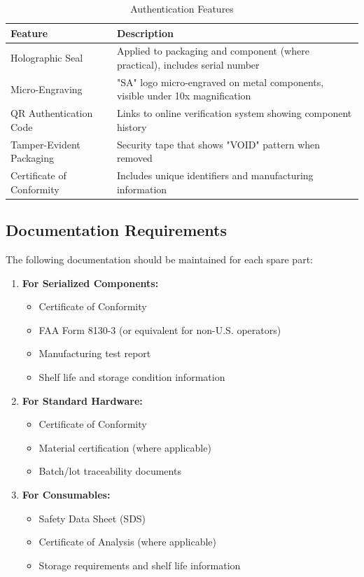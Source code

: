 \documentclass[12pt,a4paper,twoside,openright]{book}
\newcommand{\tabletextfont}{\normalfont\rmfamily}
\newcommand{\tableheadfont}{\normalfont\bfseries}
\begin{document}
\begin{table}[h]
\centering
\setlength{\tabcolsep}{5pt} %
\begin{tabular}{|p{}|p{}|}
\hline
\tableheadfont\textbf{Feature} & \tableheadfont\textbf{Description} \\
\hline
\tabletextfont Holographic Seal & Applied to packaging and component (where practical), includes serial number \\
\hline
\tabletextfont Micro-Engraving & "SA" logo micro-engraved on metal components, visible under 10x magnification \\
\hline
\tabletextfont QR Authentication Code & Links to online verification system showing component history \\
\hline
\tabletextfont Tamper-Evident Packaging & Security tape that shows "VOID" pattern when removed \\
\hline
\tabletextfont Certificate of Conformity & Includes unique identifiers and manufacturing information \\
\hline
\end{tabular}
\caption{Authentication Features}
\end{table}

\subsection{Documentation Requirements}

The following documentation should be maintained for each spare part:

\begin{enumerate}
    \item \textbf{For Serialized Components:}
    \begin{itemize}
        \item Certificate of Conformity
        \item FAA Form 8130-3 (or equivalent for non-U.S. operators)
        \item Manufacturing test report
        \item Shelf life and storage condition information
    \end{itemize}
    
    \item \textbf{For Standard Hardware:}
    \begin{itemize}
        \item Certificate of Conformity
        \item Material certification (where applicable)
        \item Batch/lot traceability documents
    \end{itemize}
    
    \item \textbf{For Consumables:}
    \begin{itemize}
        \item Safety Data Sheet (SDS)
        \item Certificate of Analysis (where applicable)
        \item Storage requirements and shelf life information
    \end{itemize}
\end{enumerate}
\end{document}
